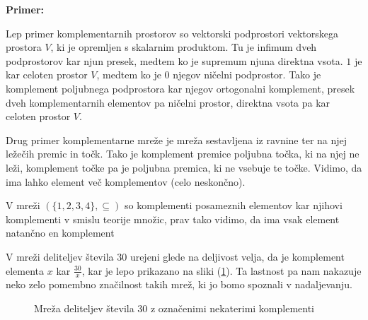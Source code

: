 \documentclass[a4paper]{article}
\newcounter{environment:definition_counter}
\newcounter{environment:theorem_counter}
\newcounter{environment:statement_counter}
\newcounter{example:example_counter}
\newenvironment{example}
{\textbf{Primer:}\\}
{\setcounter{example:example_counter}{0}}
\newenvironment{example_case}
{\refstepcounter{example:example_counter} \arabic{example:example_counter}.}
{\\}
\begin{document}
\begin{example}
\begin{example_case}
Lep primer komplementarnih prostorov so vektorski podprostori vektorskega prostora $V$, ki je opremljen s skalarnim produktom. Tu je infimum dveh podprostorov kar njun presek, medtem ko je supremum njuna direktna vsota. $1$ je kar celoten prostor $V$, medtem ko je $0$ njegov ničelni podprostor. Tako je komplement poljubnega podprostora kar njegov ortogonalni komplement, presek dveh komplementarnih elementov pa ničelni prostor, direktna vsota pa kar celoten prostor $V$.
\end{example_case}
\begin{example_case}
Drug primer komplementarne mreže je mreža sestavljena iz ravnine ter na njej ležečih premic in točk. Tako je komplement premice poljubna točka, ki na njej ne leži, komplement točke pa je poljubna premica, ki ne vsebuje te točke. Vidimo, da ima lahko element več komplementov (celo neskončno).
\end{example_case}
\begin{example_case}
V mreži $(\{1,2,3,4\}, \subseteq)$ so komplementi posameznih elementov kar njihovi komplementi v smislu teorije množic, prav tako vidimo, da ima vsak element natančno en komplement
\end{example_case}
\begin{example_case}
V mreži deliteljev števila $30$ urejeni glede na deljivost velja, da je komplement elementa $x$ kar $\frac{30}{x}$, kar je lepo prikazano na sliki (\ref{im:lattice_30_with_some_complements}). Ta lastnost pa nam nakazuje neko zelo pomembno značilnost takih mrež, ki jo bomo spoznali v nadaljevanju.
\end{example_case}
\end{example}

\begin{figure}[h]
  \centering
    \caption{Mreža deliteljev števila $30$ z označenimi nekaterimi komplementi}
    \label{im:lattice_30_with_some_complements}
  \end{figure}  
\newpage
\end{document}
